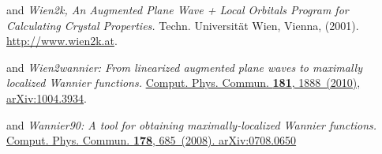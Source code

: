 \begin{thebibliography}{88}
   and
  \textit{Wien2k, An Augmented Plane Wave + Local Orbitals Program for
    Calculating Crystal Properties.}
  Techn. Universität Wien, Vienna, (2001).
  \url{http://www.wien2k.at}.

  and 
  \textit{Wien2wannier: From linearized augmented plane waves to maximally
    localized Wannier functions.}
  \href{http://www.sciencedirect.com/science/article/pii/S0010465510002948}{
    Comput. Phys. Commun. \textbf{181}, 1888~(2010),
  }
  \href{http://arxiv.org/abs/1004.3934}{arXiv:1004.3934}.

  and 
  \textit{Wannier90: A tool for obtaining maximally-localized Wannier
    functions.}
  \href{http://www.sciencedirect.com/science/article/pii/S0010465507004936}{%
    Comput. Phys. Commun. \textbf{178}, 685~(2008).
  }
  \href{http://arxiv.org/abs/0708.0650}{arXiv:0708.0650}


\end{thebibliography}


